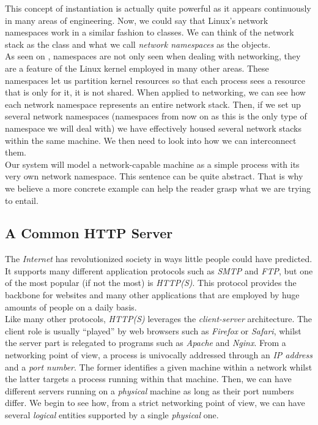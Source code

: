         This concept of instantiation is actually quite powerful as it appears continuously in many areas of engineering. Now, we could say that Linux's network namespaces work in a similar fashion to classes. We can think of the network stack as the class and what we call \textit{network namespaces} as the objects.\\

        As seen on \cite{bib:man-namespaces}, namespaces are not only seen when dealing with networking, they are a feature of the Linux kernel employed in many other areas. These namespaces let us partition kernel resources so that each process sees a resource that is only for it, it is not shared. When applied to networking, we can see how each network namespace \cite{bib:man-netns} represents an entire network stack. Then, if we set up several network namespaces (namespaces from now on as this is the only type of namespace we will deal with) we have effectively housed several network stacks within the same machine. We then need to look into how we can interconnect them.\\

        Our system will model a network-capable machine as a simple process with its very own network namespace. This sentence can be quite abstract. That is why we believe a more concrete example can help the reader grasp what we are trying to entail.\\

        \subsection{A Common HTTP Server}
            The \textit{Internet} has revolutionized society in ways little people could have predicted. It supports many different application protocols such as \textit{SMTP} and \textit{FTP}, but one of the most popular (if not the most) is \textit{HTTP(S)}. This protocol provides the backbone for websites and many other applications that are employed by huge amounts of people on a daily basis.\\

            Like many other protocols, \textit{HTTP(S)} leverages the \textit{client-server} architecture. The client role is usually ``played'' by web browsers such as \textit{Firefox} or \textit{Safari}, whilst the server part is relegated to programs such as \textit{Apache} and \textit{Nginx}. From a networking point of view, a process is univocally addressed through an \textit{IP address} and a \textit{port number}. The former identifies a given machine within a network whilst the latter targets a process running within that machine. Then, we can have different servers running on a \textit{physical} machine as long as their port numbers differ. We begin to see how, from a strict networking point of view, we can have several \textit{logical} entities supported by a single \textit{physical} one.\\

